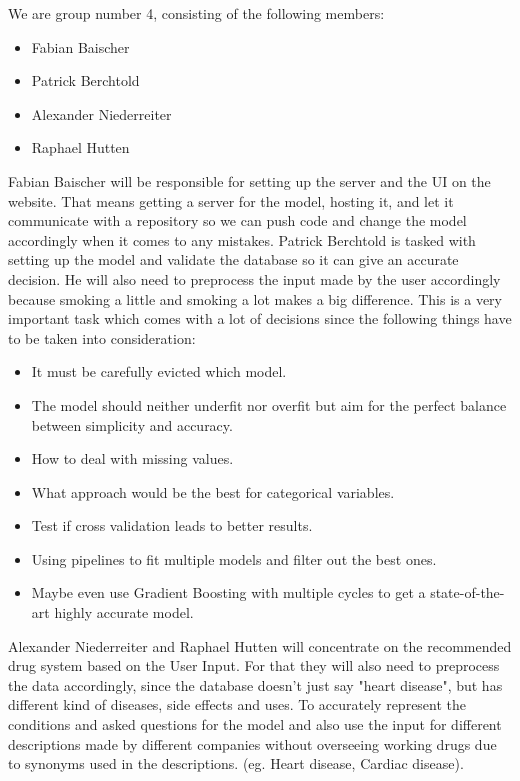 \documentclass{article}
\begin{document}
We are group number 4, consisting of the following members:
\begin{itemize}
    \item Fabian Baischer
    \item Patrick Berchtold
    \item Alexander Niederreiter
    \item Raphael Hutten
\end{itemize}
Fabian Baischer will be responsible for setting up the server and the UI on the website. That means getting a server for the model, hosting it, and let it communicate with a repository so we can push code and change the model accordingly when it comes to any mistakes.
\vspace{1em}
Patrick Berchtold is tasked with setting up the model and validate the database so it can give an accurate decision. He will also need to preprocess the input made by the user accordingly because smoking a little and smoking a lot makes a big difference. This is a very important task which comes with a lot of decisions since the following things have to be taken into consideration:
\begin{itemize}
    \item It must be carefully evicted which model. 
    \item The model should neither underfit nor overfit but aim for the perfect balance between simplicity and accuracy.
    \item How to deal with missing values.
    \item What approach would be the best for categorical variables.
    \item Test if cross validation leads to better results.
    \item Using pipelines to fit multiple models and filter out the best ones.
    \item Maybe even use Gradient Boosting with multiple cycles to get a state-of-the-art highly accurate model.
\end{itemize}
\vspace{1em}
Alexander Niederreiter and Raphael Hutten will concentrate on the recommended drug system based on the User Input. For that they will also need to preprocess the data accordingly, since the database doesn't just say "heart disease", but has different kind of diseases, side effects and uses. To accurately represent the conditions and asked questions for the model and also use the input for different descriptions made by different companies without overseeing working drugs due to synonyms used in the descriptions. (eg. Heart disease, Cardiac disease).
\end{document}
